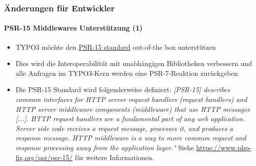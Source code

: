 \begin{frame}[fragile]
	\frametitle{Änderungen für Entwickler}
	\framesubtitle{PSR-15 Middlewares Unterstützung (1)}

	\begin{itemize}
		\item TYPO3 möchte den \href{https://www.php-fig.org/psr/psr-15/}{PSR-15 standard} out-of-the box
			unterstützen
		\item Dies wird die Interoperabilität mit unabhängigen Bibliotheken verbessern und alle 
			Anfragen im TYPO3-Kern werden eine PSR-7-Reaktion zurückgeben

		\item Die PSR-15 Standard wird folgenderweise definiert:
			\newline
			\smaller
				\textit{[PSR-15] describes common interfaces for HTTP server request handlers
				(request handlers) and HTTP server middleware components (middleware) that use
				HTTP messages [...]. HTTP request handlers are a fundamental part of any web
				application. Server side code receives a request message, processes it, and
				produces a response message. HTTP middleware is a way to move common request
				and response processing away from the application layer."}
				\newline
				Siehe \url{https://www.php-fig.org/psr/psr-15/} für weitere Informationen.
			\normalsize

	\end{itemize}


\end{frame}


